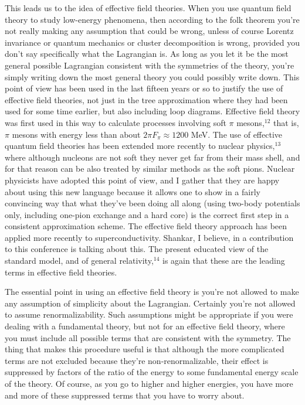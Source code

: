 \documentclass[12pt]{article}
\begin{document}
This leads us to the idea of effective field theories.  When
you use  quantum field theory to study low-energy phenomena,
then according to the folk theorem you're not really making
any assumption that could be wrong, unless of course Lorentz
invariance or quantum mechanics or cluster decomposition is
wrong, provided you don't say specifically what the
Lagrangian is. As long as you let it be the most general
possible Lagrangian consistent with the symmetries of the
theory, you're simply writing down the most general theory
you could possibly write down.  This point of view has been
used in the last fifteen years or so to justify the use of
effective field theories, not just  in the tree
approximation where they had been used for some time
earlier, but also including loop diagrams.  Effective field
theory was first used in this way to calculate processes
involving soft $\pi$ mesons,$^{12}$ that is, $\pi$ mesons
with energy less
than about $2\pi F_\pi\approx 1200$ MeV.  The use of
effective quantum field theories has been extended more
recently to nuclear physics,$^{13}$  where although nucleons
are
not soft they never get far from their mass shell, and for
that reason can be also treated by similar methods as the
soft pions.  Nuclear physicists have adopted this point of
view, and I gather that they are happy about using this new
language because it allows one to show in a fairly
convincing way that what they've been doing all along (using
two-body potentials only, including one-pion exchange and a
hard core) is the correct first step in a consistent
approximation scheme.      The effective field theory
approach has been applied more recently to
superconductivity. Shankar, I believe, in a contribution to
this conference is talking about this.  The present educated
view of the standard model, and of general
relativity,$^{14}$ is
again that these are the leading terms in effective field
theories.

The essential point in using  an effective field theory is
you're not allowed to make any assumption of simplicity
about the Lagrangian.  Certainly you're not allowed to
assume renormalizability.  Such assumptions might be
appropriate if you were dealing with a fundamental theory,
but not for an effective field theory, where you must
include all possible terms that are consistent with the
symmetry.  The thing that makes this procedure useful is
that although the more complicated terms are not excluded
because they're non-renormalizable, their effect is
suppressed by factors of the ratio of the energy to some
fundamental energy scale of the theory.   Of course,  as you
go to higher and higher energies, you have more and more of
these suppressed terms that you have to worry about.
\end{document}
